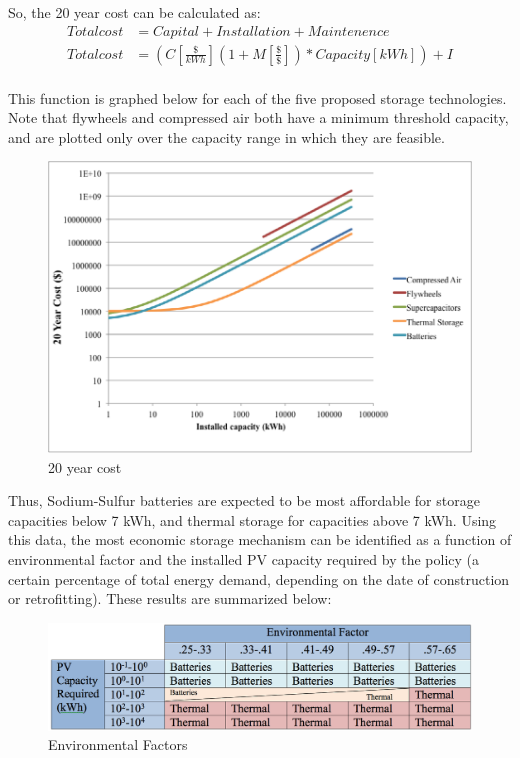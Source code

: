 So, the 20 year cost can be calculated as:
\begin{equation}
\begin{aligned}
Total cost&=Capital+Installation+Maintenence\\
Total cost&=(C[\frac{\$}{kWh}](1+M[\frac{\$}{\$}])*Capacity[kWh])+I\\
\end{aligned}
\end{equation}

This function is graphed below for each of the five proposed storage
technologies. Note that flywheels and compressed air both have a minimum
threshold capacity, and are plotted only over the capacity range in which they
are feasible.

\begin{figure}
\begin{center}
\includegraphics[scale=1.0]{pics/PatrickFigure5.png}
\caption{20 year cost}
\label{p5}
\end{center}
\end{figure}

Thus, Sodium-Sulfur batteries are expected to be most affordable for storage
capacities below 7 kWh, and thermal storage for capacities above 7 kWh. Using
this data, the most economic storage mechanism can be identified as a function
of environmental factor and the installed PV capacity required by the policy (a
certain percentage of total energy demand, depending on the date of
construction or retrofitting). These results are summarized below:

\begin{figure}
\begin{center}
\includegraphics[scale=0.3]{pics/PatrickTable1.png}
\caption{Environmental Factors}
\label{patrickTable1}
\end{center}
\end{figure}

